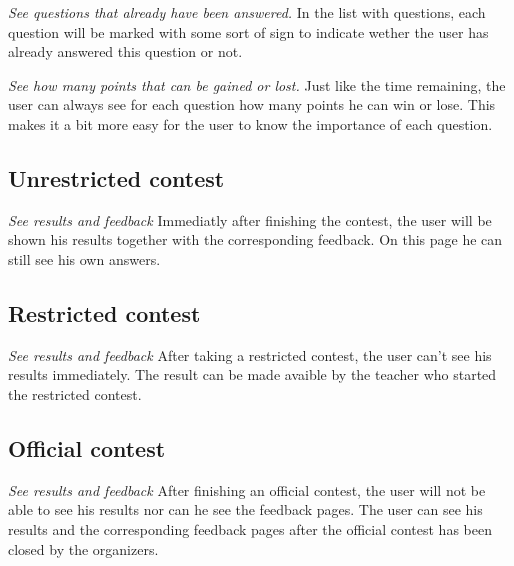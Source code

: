 \textit{See questions that already have been answered.} 
In the list with questions, each question will be marked with some sort of sign to indicate wether the user has already answered this question or not. 

\textit{See how many points that can be gained or lost.}
Just like the time remaining, the user can always see for each question how many points he can win or lose. This makes it a bit more easy for the user to know the importance of each question. 

\subsection*{Unrestricted contest}

\textit{See results and feedback}
Immediatly after finishing the contest, the user will be shown his results together with the corresponding feedback. On this page he can still see his own answers. 

\subsection*{Restricted contest}

\textit{See results and feedback}
After taking a restricted contest, the user can't see his results immediately. The result can be made avaible by the teacher who started the restricted contest. 

\subsection*{Official contest}

\textit{See results and feedback}
After finishing an official contest, the user will not be able to see his results nor can he see the feedback pages. The user can see his results and the corresponding feedback pages after the official contest has been closed by the organizers. 



